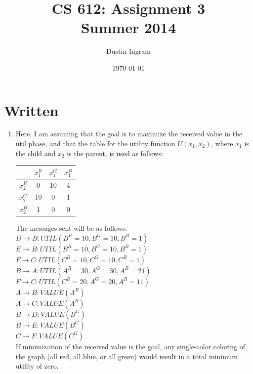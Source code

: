 \documentclass{article}
\title{CS 612: Assignment 3\\Summer 2014}
\author{Dustin Ingram}
\date{\today}
\begin{document}
\maketitle

\section*{Written}


\begin{enumerate}

\item{} %
Here, I am assuming that the goal is to maximize the received value in the util phase, and that the table for the utility function $U(x_1, x_2)$, where $x_1$ is the child and $x_2$ is the parent, is used as follows:

\begin{center}
\begin{tabular}{ |c|c|c|c| }
    \hline
            & $x_1^R$ & $x_1^G$ & $x_1^B$ \\\hline
    $x_2^R$ &  0 & 10 &  4 \\\hline
    $x_2^G$ & 10 &  0 &  1 \\\hline
    $x_2^B$ &  1 &  0 &  0 \\\hline
\end{tabular}
\end{center}

The messages sent will be as follows:\\

$D\rightarrow B:UTIL(B^R=10, B^G=10, B^B=1)$\\
$E\rightarrow B:UTIL(B^R=10, B^G=10, B^B=1)$\\
$F\rightarrow C:UTIL(C^R=10, C^G=10, C^B=1)$\\
$B\rightarrow A:UTIL(A^R=30, A^G=30, A^B=21)$\\
$F\rightarrow C:UTIL(C^R=20, A^G=20, A^B=11)$\\
$A\rightarrow B:VALUE(A^R)$\\
$A\rightarrow C:VALUE(A^R)$\\
$B\rightarrow D:VALUE(B^G)$\\
$B\rightarrow E:VALUE(B^G)$\\
$C\rightarrow F:VALUE(C^G)$\\

If minimization of the received value is the goal, any single-color coloring of the graph (all red, all blue, or all green) would result in a total minimum utility of zero.


\end{enumerate}
\end{document}
